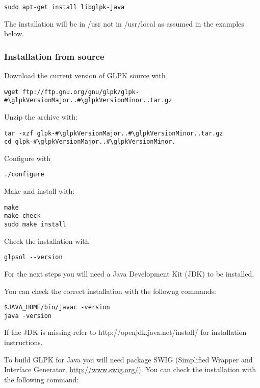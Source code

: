 \documentclass[a4paper,11pt]{report}
\newcommand{\glpkVersionMajor}{4}
\newcommand{\glpkVersionMinor}{54}
\begin{document}
\begin{lstlisting}
sudo apt-get install libglpk-java
\end{lstlisting}

The installation will be in /usr not in /usr/local as assumed in the examples below.

\subsubsection{Installation from source}

Download the current version of GLPK source with

\begin{lstlisting}
wget ftp://ftp.gnu.org/gnu/glpk/glpk-#\glpkVersionMajor..#\glpkVersionMinor..tar.gz
\end{lstlisting}

Unzip the archive with:

\begin{lstlisting}
tar -xzf glpk-#\glpkVersionMajor..#\glpkVersionMinor..tar.gz
cd glpk-#\glpkVersionMajor..#\glpkVersionMinor.
\end{lstlisting}

Configure with

\begin{lstlisting}
./configure
\end{lstlisting}

Make and install with:

\begin{lstlisting}
make
make check
sudo make install
\end{lstlisting}

Check the installation with

\begin{lstlisting}
glpsol --version
\end{lstlisting}

For the next steps you will need a Java Development Kit (JDK) to be installed.

You can check the correct installation with the followng commands:

\begin{lstlisting}
$JAVA_HOME/bin/javac -version
java -version
\end{lstlisting}

If the JDK is missing refer to http://openjdk.java.net/install/ for
installation instructions.

To build GLPK for Java you will need package SWIG (Simplified Wrapper and
Interface Generator, \href{http://www.swig.org/}{http://www.swig.org/}). You
can check the installation with the following command:
\end{document}
